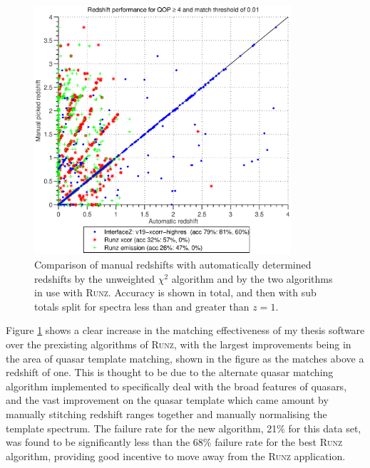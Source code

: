 \documentclass[titlesmallcaps, examinerscopy, copyrightpage]{uqthesis}
\newcommand{\runz}{\textsc{Runz}}
\begin{document}
\begin{figure}[ht!]
\includegraphics[width=0.85\textwidth]{images/final.eps} 
\centering
\caption{Comparison of manual redshifts with automatically determined redshifts by the unweighted $\chi^2$ algorithm and by the two algorithms in use with \runz{}. Accuracy is shown in total, and then with sub totals split for spectra less than and greater than $z=1$.}
\label{fig:final}
\end{figure}

Figure \ref{fig:final} shows a clear increase in the matching effectiveness of my thesis software over the prexisting algorithms of \runz{}, with the largest improvements being in the area of quasar template matching, shown in the figure as the matches above a redshift of one. This is thought to be  due to the alternate quasar matching algorithm implemented to specifically deal with the broad features of quasars, and the vast improvement on the quasar template which came amount by manually stitching redshift ranges together and manually normalising the template spectrum. The failure rate for the new algorithm, 21\% for this data set, was found to be significantly less than the 68\% failure rate for the best \runz{} algorithm, providing good incentive to move away from the \runz{} application.
\end{document}
